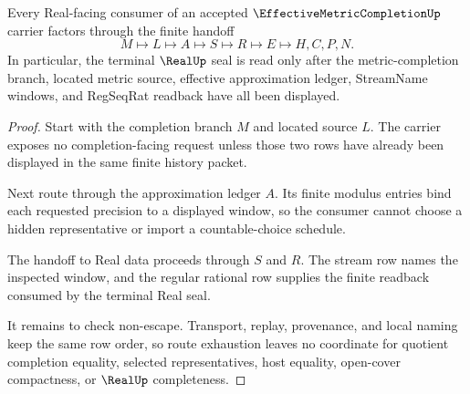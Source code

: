 \begin{theorem}
\label{thm:effective-metric-completion-real-seal-handoff}
Every Real-facing consumer of an accepted $\EffectiveMetricCompletionUp$ carrier factors through the finite handoff
$$
M\longmapsto L\longmapsto A\longmapsto S\longmapsto R\longmapsto E\longmapsto H,C,P,N .
$$
In particular, the terminal $\RealUp$ seal is read only after the metric-completion branch, located metric source, effective approximation ledger, StreamName windows, and RegSeqRat readback have all been displayed.
\end{theorem}
\begin{proof}
Start with the completion branch $M$ and located source $L$. The carrier exposes no completion-facing request unless those two rows have already been displayed in the same finite history packet.

Next route through the approximation ledger $A$. Its finite modulus entries bind each requested precision to a displayed window, so the consumer cannot choose a hidden representative or import a countable-choice schedule.

The handoff to Real data proceeds through $S$ and $R$. The stream row names the inspected window, and the regular rational row supplies the finite readback consumed by the terminal Real seal.

It remains to check non-escape. Transport, replay, provenance, and local naming keep the same row order, so route exhaustion leaves no coordinate for quotient completion equality, selected representatives, host equality, open-cover compactness, or $\RealUp$ completeness.
\end{proof}

\begin{closurestatus}{\EffectiveMetricCompletionUp}
  \theoryclosure{\seedClosure}
  \formalstatus{\unformalizedV}
\end{closurestatus}
